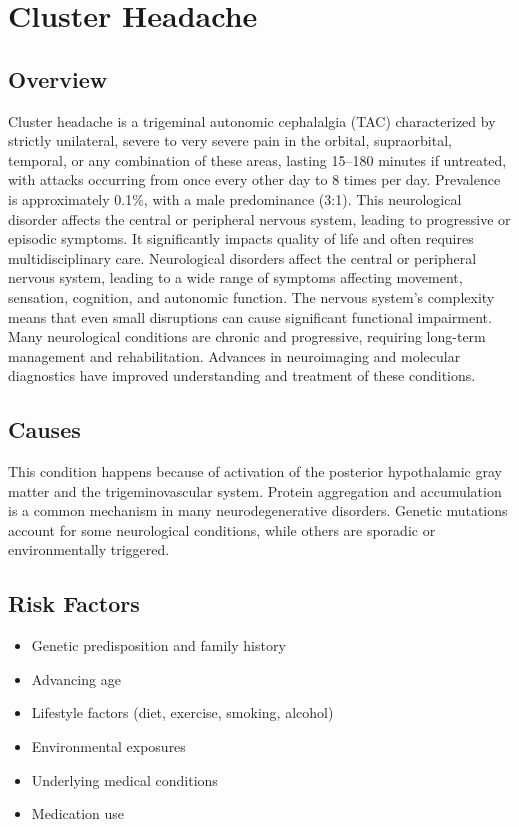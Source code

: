 \chapter{Cluster Headache}
\label{sec:Cluster Headache}

\section{Overview}
Cluster headache is a trigeminal autonomic cephalalgia (TAC) characterized by strictly unilateral, severe to very severe pain in the orbital, supraorbital, temporal, or any combination of these areas, lasting 15--180 minutes if untreated, with attacks occurring from once every other day to 8 times per day. Prevalence is approximately 0.1\%, with a male predominance (3:1). This neurological disorder affects the central or peripheral nervous system, leading to progressive or episodic symptoms. It significantly impacts quality of life and often requires multidisciplinary care. Neurological disorders affect the central or peripheral nervous system, leading to a wide range of symptoms affecting movement, sensation, cognition, and autonomic function. The nervous system's complexity means that even small disruptions can cause significant functional impairment. Many neurological conditions are chronic and progressive, requiring long-term management and rehabilitation. Advances in neuroimaging and molecular diagnostics have improved understanding and treatment of these conditions.
\section{Causes}
This condition happens because of activation of the posterior hypothalamic gray matter and the trigeminovascular system.    Protein aggregation and accumulation is a common mechanism in many neurodegenerative disorders.  Genetic mutations account for some neurological conditions, while others are sporadic or environmentally triggered.   
\section{Risk Factors}
\begin{itemize}[noitemsep]
  \item Genetic predisposition and family history
  \item Advancing age
  \item Lifestyle factors (diet, exercise, smoking, alcohol)
  \item Environmental exposures
  \item Underlying medical conditions
  \item Medication use
\end{itemize}
